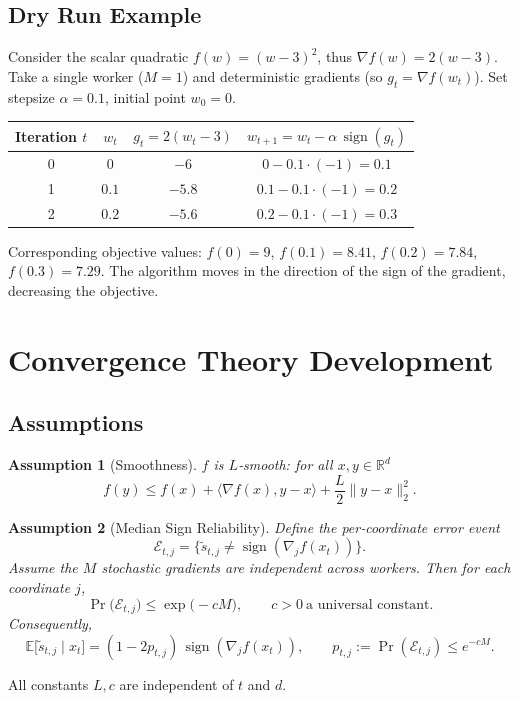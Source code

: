 \documentclass{article}
\newtheorem{assumption}{Assumption}
\newcommand{\sign}{\operatorname{sign}}
\newcommand{\E}{\mathbb{E}}
\newcommand{\R}{\mathbb{R}}
\begin{document}
\subsection*{Dry Run Example}
Consider the scalar quadratic $f(w)=(w-3)^{2}$, thus $\nabla f(w)=2(w-3)$.
Take a single worker ($M=1$) and deterministic gradients (so $g_{t}= \nabla f(w_{t})$).  
Set stepsize $\alpha=0.1$, initial point $w_{0}=0$.

\begin{center}
\begin{tabular}{c|c|c|c}
Iteration $t$ & $w_{t}$ & $g_{t}=2(w_{t}-3)$ & $w_{t+1}=w_{t}-\alpha\,\sign(g_{t})$\\ \hline
0 & $0$ & $-6$ & $0-0.1\cdot(-1)=0.1$\\
1 & $0.1$ & $-5.8$ & $0.1-0.1\cdot(-1)=0.2$\\
2 & $0.2$ & $-5.6$ & $0.2-0.1\cdot(-1)=0.3$\\
\end{tabular}
\end{center}
Corresponding objective values: $f(0)=9$, $f(0.1)=8.41$, $f(0.2)=7.84$, $f(0.3)=7.29$.
The algorithm moves in the direction of the sign of the gradient, decreasing the objective.

\section*{Convergence Theory Development}
\subsection*{Assumptions}
\begin{assumption}[Smoothness]\label{ass:smooth}
$f$ is $L$‑smooth: for all $x,y\in\R^{d}$
\[
f(y)\le f(x)+\langle\nabla f(x),y-x\rangle+\frac{L}{2}\|y-x\|_{2}^{2}.
\]
\end{assumption}
\begin{assumption}[Median Sign Reliability]\label{ass:median}
Define the per‑coordinate error event 
\[
\mathcal{E}_{t,j}=\big\{\tilde{s}_{t,j}\neq\sign(\nabla_{j}f(x_{t}))\big\}.
\]
Assume the $M$ stochastic gradients are independent across workers.  
Then for each coordinate $j$,
\[
\Pr\big(\mathcal{E}_{t,j}\big)\le \exp\!\big(-cM\big),\qquad 
c>0\ \text{a universal constant}.
\tag{A3}
\]
Consequently,
\[
\E\big[\tilde{s}_{t,j}\mid x_{t}\big]
    =(1-2p_{t,j})\,\sign(\nabla_{j}f(x_{t})),\qquad 
    p_{t,j}:=\Pr(\mathcal{E}_{t,j})\le e^{-cM}.
\tag{A3$'$}
\]
\end{assumption}
All constants $L,c$ are independent of $t$ and $d$.
\end{document}
